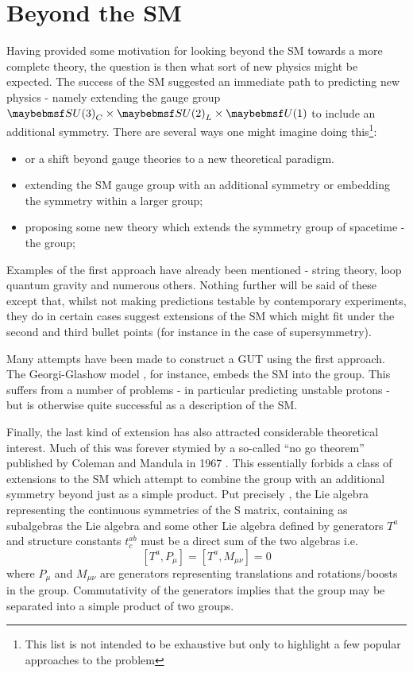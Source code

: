 \section{Beyond the \acl{SM}}
Having provided some motivation for looking beyond the \ac{SM} towards a more
complete theory, the question is then what sort of new physics might be
expected. The success of the \ac{SM} suggested an immediate path to predicting
new physics - namely extending the gauge group
$\SUthree_C\times\SUtwo_L\times\Uone$ to include an additional symmetry. There
are several ways one might imagine doing this\footnote{This list is not intended
  to be exhaustive but only to highlight a few popular approaches to the problem}:
\begin{itemize}
\item or a shift beyond gauge theories to a new theoretical paradigm.
\item extending the \ac{SM} gauge group with an additional symmetry or embedding
  the symmetry within a larger group;
\item proposing some new theory which extends the symmetry group of spacetime -
  the \Poincare group;
\end{itemize}

Examples of the first approach have already been mentioned - string theory, loop
quantum gravity and numerous others. Nothing further will be said of these
except that, whilst not making predictions testable by contemporary experiments,
they do in certain cases suggest extensions of the \ac{SM} which might fit under
the second and third bullet points (for instance in the case of supersymmetry).

Many attempts have been made to construct a \acl{GUT} using the first
approach. The Georgi-Glashow model \cite{georgi_glashow}, for instance, embeds
the \ac{SM} into the \SUfive group. This suffers from a number of problems - in
particular predicting unstable protons - but is otherwise quite successful as a
description of the \ac{SM}.

Finally, the last kind of extension has also attracted considerable theoretical
interest. Much of this was forever stymied by a so-called ``no go theorem''
published by Coleman and Mandula in 1967 \cite{coleman_mandula}. This
essentially forbids a class of extensions to the \ac{SM} which attempt to
combine the \Poincare group with an additional symmetry beyond just as a simple
product. Put precisely \cite{sparticles}, the Lie algebra representing the
continuous symmetries of the S matrix, containing as subalgebras the \Poincare
Lie algebra and some other Lie algebra defined by generators $T^a$ and structure
constants $t^{ab}_c$ must be a direct sum of the two algebras i.e.
\begin{equation}
\left[T^a, P_{\mu}\right] = \left[T^a, M_{\mu\nu}\right] = 0
\end{equation}
where $P_{\mu}$ and $M_{\mu\nu}$ are generators representing translations and
rotations/boosts in the \Poincare group. Commutativity of the generators implies
that the group may be separated into a simple product of two groups.

